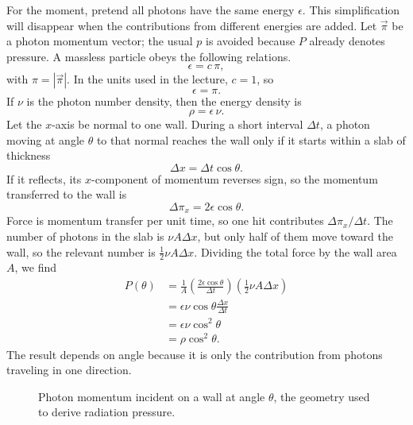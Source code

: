 For the moment, pretend all photons have the same energy \(\epsilon\). This simplification will disappear when the contributions from different energies are added. Let \(\vec{\pi}\) be a photon momentum vector; the usual \(p\) is avoided because \(P\) already denotes pressure. A massless particle obeys the following relations.
\begin{equation}
\epsilon=c\,\pi,
\end{equation}
with \(\pi=|\vec{\pi}|\). In the units used in the lecture, \(c=1\), so
\begin{equation}
\epsilon=\pi.
\end{equation}
If \(\nu\) is the photon number density, then the energy density is
\begin{equation}
\rho=\epsilon\,\nu.
\end{equation}
Let the \(x\)-axis be normal to one wall. During a short interval \(\Delta t\), a photon moving at angle \(\theta\) to that normal reaches the wall only if it starts within a slab of thickness
\begin{equation}
\Delta x=\Delta t\cos\theta.
\end{equation}
If it reflects, its \(x\)-component of momentum reverses sign, so the momentum transferred to the wall is
\begin{equation}
\Delta \pi_x=2\epsilon\cos\theta.
\end{equation}
Force is momentum transfer per unit time, so one hit contributes \(\Delta \pi_x/\Delta t\). The number of photons in the slab is \(\nu A\Delta x\), but only half of them move toward the wall, so the relevant number is \(\tfrac12 \nu A\Delta x\). Dividing the total force by the wall area \(A\), we find
\begin{align}
P(\theta)
&=
\frac{1}{A}
\left(\frac{2\epsilon\cos\theta}{\Delta t}\right)
\left(\frac12 \nu A\Delta x\right) \\
&=
\epsilon\nu\cos\theta\frac{\Delta x}{\Delta t} \\
&=
\epsilon\nu\cos^2\theta \\
&=
\rho\cos^2\theta.
\end{align}
The result depends on angle because it is only the contribution from photons traveling in one direction.

\begin{figure}[htbp]
\centering
{}
\caption{Photon momentum incident on a wall at angle \(\theta\), the geometry used to derive radiation pressure.}
\label{fig:c05-photon-pressure}
\end{figure}

